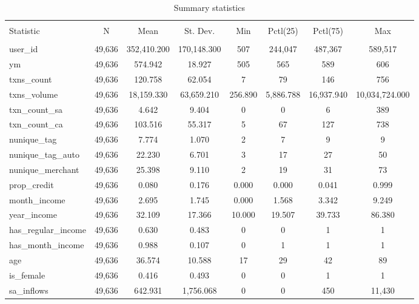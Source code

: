 
\begin{table}[!htbp] \centering 
  \caption{Summary statistics} 
  \label{tab:sumstats} 
\scriptsize 
\begin{tabular}{@{\extracolsep{5pt}}lccccccc} 
\\[-1.8ex]\hline 
\hline \\[-1.8ex] 
Statistic & \multicolumn{1}{c}{N} & \multicolumn{1}{c}{Mean} & \multicolumn{1}{c}{St. Dev.} & \multicolumn{1}{c}{Min} & \multicolumn{1}{c}{Pctl(25)} & \multicolumn{1}{c}{Pctl(75)} & \multicolumn{1}{c}{Max} \\ 
\hline \\[-1.8ex] 
user\_id & 49,636 & 352,410.200 & 170,148.300 & 507 & 244,047 & 487,367 & 589,517 \\ 
ym & 49,636 & 574.942 & 18.927 & 505 & 565 & 589 & 606 \\ 
txns\_count & 49,636 & 120.758 & 62.054 & 7 & 79 & 146 & 756 \\ 
txns\_volume & 49,636 & 18,159.330 & 63,659.210 & 256.890 & 5,886.788 & 16,937.940 & 10,034,724.000 \\ 
txn\_count\_sa & 49,636 & 4.642 & 9.404 & 0 & 0 & 6 & 389 \\ 
txn\_count\_ca & 49,636 & 103.516 & 55.317 & 5 & 67 & 127 & 738 \\ 
nunique\_tag & 49,636 & 7.774 & 1.070 & 2 & 7 & 9 & 9 \\ 
nunique\_tag\_auto & 49,636 & 22.230 & 6.701 & 3 & 17 & 27 & 50 \\ 
nunique\_merchant & 49,636 & 25.398 & 9.110 & 2 & 19 & 31 & 73 \\ 
prop\_credit & 49,636 & 0.080 & 0.176 & 0.000 & 0.000 & 0.041 & 0.999 \\ 
month\_income & 49,636 & 2.695 & 1.745 & 0.000 & 1.568 & 3.342 & 9.249 \\ 
year\_income & 49,636 & 32.109 & 17.366 & 10.000 & 19.507 & 39.733 & 86.380 \\ 
has\_regular\_income & 49,636 & 0.630 & 0.483 & 0 & 0 & 1 & 1 \\ 
has\_month\_income & 49,636 & 0.988 & 0.107 & 0 & 1 & 1 & 1 \\ 
age & 49,636 & 36.574 & 10.588 & 17 & 29 & 42 & 89 \\ 
is\_female & 49,636 & 0.416 & 0.493 & 0 & 0 & 1 & 1 \\ 
sa\_inflows & 49,636 & 642.931 & 1,756.068 & 0 & 0 & 450 & 11,430 \\ 

\end{tabular}
\end{table}
